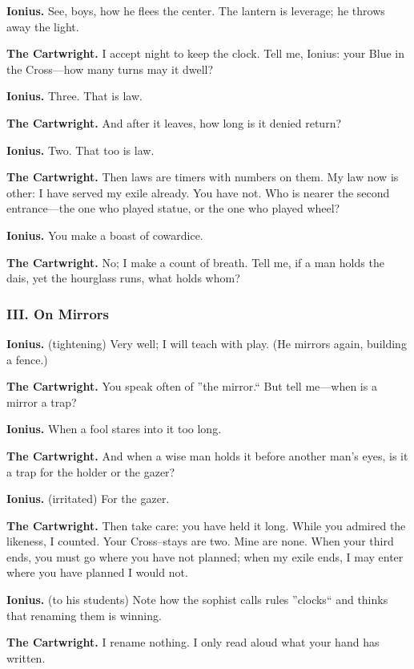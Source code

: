 \documentclass[11pt]{article}
\begin{document}
\noindent\textbf{Ionius.} See, boys, how he flees the center. The lantern is leverage; he throws away the light.

\noindent\textbf{The Cartwright.} I accept night to keep the clock. Tell me, Ionius: your Blue in the Cross---how many turns may it dwell?

\noindent\textbf{Ionius.} Three. That is law.

\noindent\textbf{The Cartwright.} And after it leaves, how long is it denied return?

\noindent\textbf{Ionius.} Two. That too is law.

\noindent\textbf{The Cartwright.} Then laws are timers  with numbers on them. My law now is other: I have served my exile already. You have not. Who is nearer the second entrance---the one who played statue, or the one who played wheel?

\noindent\textbf{Ionius.} You make a boast of cowardice.

\noindent\textbf{The Cartwright.} No; I make a count of breath. Tell me, if a man holds the dais, yet the hourglass runs, what holds whom?

\medskip
\subsubsection*{III. On Mirrors}
\noindent\textbf{Ionius.} (tightening) Very well; I will teach with play. (He mirrors again, building a fence.)

\noindent\textbf{The Cartwright.} You speak often of ''the mirror.`` But tell me---when is a mirror a trap?

\noindent\textbf{Ionius.} When a fool stares into it too long.

\noindent\textbf{The Cartwright.} And when a wise man holds it before another man's eyes, is it a trap for the holder or the gazer?

\noindent\textbf{Ionius.} (irritated) For the gazer.

\noindent\textbf{The Cartwright.} Then take care: you have held it long. While you admired the likeness, I counted. Your Cross--stays are two. Mine are none. When your third ends, you must go where you have not planned; when my exile ends, I may enter where you have planned I would not.

\noindent\textbf{Ionius.} (to his students) Note how the sophist calls rules ''clocks`` and thinks that renaming them is winning.

\noindent\textbf{The Cartwright.} I rename nothing. I only read aloud what your hand has written.
\end{document}
